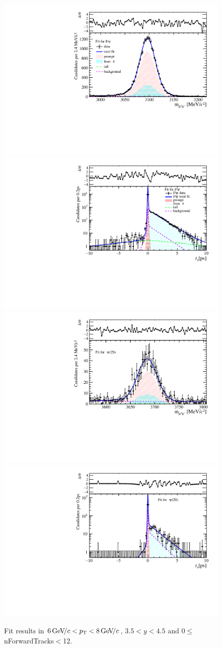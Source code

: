 \begin{figure}[H]
\begin{center}
\includegraphics[width=0.47\linewidth]{pdf/Jpsi/drawmassF/n1y3pt4.pdf}
\includegraphics[width=0.47\linewidth]{pdf/Jpsi/2DFitF/n1y3pt4.pdf}
\vspace*{-0.5cm}
\includegraphics[width=0.47\linewidth]{pdf/Psi2S/drawmassF/n1y3pt4.pdf}
\includegraphics[width=0.47\linewidth]{pdf/Psi2S/2DFitF/n1y3pt4.pdf}
\vspace*{-0.5cm}
\end{center}
\caption{Fit results in $6\text{\,Ge\kern -0.1em V\!/}c<p_{\mathrm{T}}<8\text{\,Ge\kern -0.1em V\!/}c$, $3.5<y<4.5$ and 0$\leq$nForwardTracks$<$12.}
\label{Fitn1y3pt4}
\end{figure}
